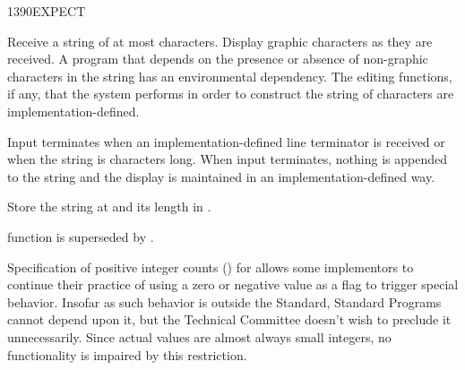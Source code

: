 \begin{worddef}{1390}{EXPECT}
\item {}

	Receive a string of at most  characters. Display graphic
	characters as they are received. A program that depends on
	the presence or absence of non-graphic characters in the
	string has an environmental dependency. The editing functions,
	if any, that the system performs in order to construct the
	string of characters are implementation-defined.

	Input terminates when an implementation-defined line terminator
	is received or when the string is  characters long. When
	input terminates, nothing is appended to the string and the
	display is maintained in an implementation-defined way.

	Store the string at  and its length in .

\note
	 function is superseded
	by .

	\begin{rationale} %
		Specification of positive integer counts () for
		 allows some implementors to continue their
		practice of using a zero or negative value as a flag to
		trigger special behavior. Insofar as such behavior is outside
		the Standard, Standard Programs cannot depend upon it, but
		the Technical Committee doesn't wish to preclude it
		unnecessarily. Since actual values are almost always small
		integers, no functionality is impaired by this restriction.
	\end{rationale}
\end{worddef}


